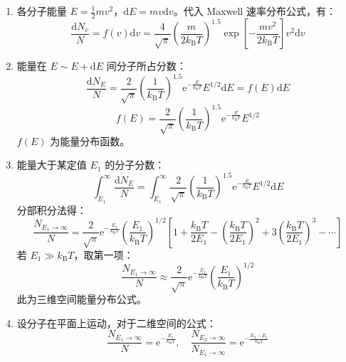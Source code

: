 \begin{enumerate}
    \item 各分子能量 $E = \frac12 m v^2$，$\mathrm{d}E = m v \mathrm{d}v$。代入 Maxwell 速率分布公式，有：
    \begin{equation*}
        \frac{\mathrm{d}N_v}{N} = f(v)\mathrm{d}v = \frac{4}{\sqrt{\pi}} \left(\frac{m}{2k_{\mathrm{B}}T}\right)^{1.5} \exp\left[-\frac{mv^2}{2k_{\mathrm{B}}T}\right] v^2 \mathrm{d}v
    \end{equation*}
    \item 能量在 $E \sim E + \mathrm{d}E$ 间分子所占分数：
    \begin{equation*}
        \frac{\mathrm{d}N_E}{N} = \frac{2}{\sqrt{\pi}} \left(\frac{1}{k_{\mathrm{B}}T}\right)^{1.5} \mathrm{e}^{-\frac{E}{k_{\mathrm{B}}T}} E^{1/2} \mathrm{d}E = f(E)\mathrm{d}E
    \end{equation*}
    \begin{equation}
        f(E) = \frac{2}{\sqrt{\pi}} \left(\frac{1}{k_{\mathrm{B}}T}\right)^{1.5} \mathrm{e}^{-\frac{E}{k_{\mathrm{B}}T}} E^{1/2}
    \end{equation}
    $f(E)$ 为能量分布函数。
    
    \item 能量大于某定值 $E_1$ 的分子分数：
    \begin{equation*}
        \int_{E_1}^{\infty} \frac{\mathrm{d}N_E}{N} = \int_{E_1}^{\infty} \frac{2}{\sqrt{\pi}} \left(\frac{1}{k_{\mathrm{B}}T}\right)^{1.5} \mathrm{e}^{-\frac{E}{k_{\mathrm{B}}T}} E^{1/2} \mathrm{d}E
    \end{equation*}
    分部积分法得：
    \begin{equation*}
        \frac{N_{E_1 \to \infty}}{N} = \frac{2}{\sqrt{\pi}} \mathrm{e}^{-\frac{E_1}{k_{\mathrm{B}}T}} \left(\frac{E_1}{k_{\mathrm{B}}T}\right)^{1/2} \left[1 + \frac{k_{\mathrm{B}}T}{2E_1} - \left(\frac{k_{\mathrm{B}}T}{2E_1}\right)^2 + 3\left(\frac{k_{\mathrm{B}}T}{2E_1}\right)^3 - \cdots\right]
    \end{equation*}
    若 $E_1 \gg k_{\mathrm{B}}T$，取第一项：
    \begin{equation}
        \frac{N_{E_1 \to \infty}}{N} \approx \frac{2}{\sqrt{\pi}} \mathrm{e}^{-\frac{E_1}{k_{\mathrm{B}}T}} \left(\frac{E_1}{k_{\mathrm{B}}T}\right)^{1/2}
    \end{equation}
    此为三维空间能量分布公式。
    
    \item 设分子在平面上运动，对于二维空间的公式：
    \begin{equation*}
        \frac{N_{E_1 \to \infty}}{N} = \mathrm{e}^{-\frac{E_1}{k_{\mathrm{B}}T}}, \quad \frac{N_{E_2 \to \infty}}{N_{E_1 \to \infty}} = \mathrm{e}^{-\frac{E_2 - E_1}{k_{\mathrm{B}}T}}
    \end{equation*}
\end{enumerate}

